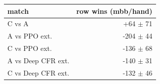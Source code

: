 \begin{tabular}{lr}
\toprule
match & row wins (mbb/hand) \\
\midrule
C vs A & +64 $\pm$ 71 \\
A vs PPO ext. & -204 $\pm$ 44 \\
C vs PPO ext. & -136 $\pm$ 68 \\
A vs Deep CFR ext. & -140 $\pm$ 31 \\
C vs Deep CFR ext. & -132 $\pm$ 46 \\
\bottomrule
\end{tabular}
